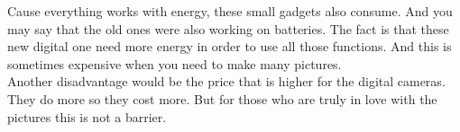 \documentclass[a4paper,14pt]{extreport}
\begin{document}
\begin{itemize}
  \noindent{\color{red} \rule{\linewidth}{1mm} }

  Cause everything works with energy, these small gadgets also consume. And you may say that the old ones were also working on batteries. The fact is that these new digital one need more energy in order to use all those functions. And this is sometimes expensive when you need to make many pictures.\\

  Another disadvantage would be the price that is higher for the digital cameras. They do more so they cost more. But for those who are truly in love with the pictures this is not a barrier.


\end{itemize}
\end{document}
